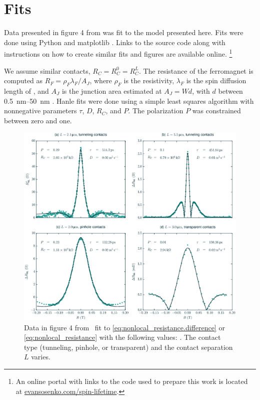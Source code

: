 \section{Fits}
\label{s:spin-lifetime:fits}

Data presented in figure 4 from
\cite{PhysRevLett.105.167202}
was fit to the model presented here.
Fits were done using Python and matplotlib
\cite{Hunter:2007}.
Links to the source code along with instructions
on how to create similar fits and figures are available online.%
\footnote{%
  An online portal with links
  to the code used to prepare this work is located at
  \href{http://evansosenko.com/spin-lifetime}{evansosenko.com/spin-lifetime}.
}

We assume similar contacts, $R_C = R_C^0 = R_C^L$.
The resistance of the ferromagnet  is computed as
$R_F = ρ_F λ_F / A_J$,
where $ρ_F$ is the  resistivity,
$λ_F$ is the spin diffusion length of ,
and $A_J$ is the junction area estimated at $A_J = W d$,
with $d$ between \SIrange[range-phrase={~and~}]{0.5}{50}{\nano\meter}
\cite{PhysRevLett.105.167202}.
Hanle fits were done using a simple least squares algorithm
with nonnegative parameters $τ$, $D$, $R_C$, and $P$.
The polarization $P$ was constrained between zero and one.

\begin{figure}
  \centering
  \includegraphics[width=\textwidth]{figures/plot_fits}
  \caption{%
    Data in figure 4 from~\cite{PhysRevLett.105.167202}
    fit to \cref{eq:nonlocal_resistance.difference}
    or \cref{eq:nonlocal_resistance}
    with the following values: \plotFitsInfo.
    The contact type (tunneling, pinhole, or transparent)
    and the contact separation $L$ varies.
  }\label{fig:nonlocal_resistance.fits}
\end{figure}

